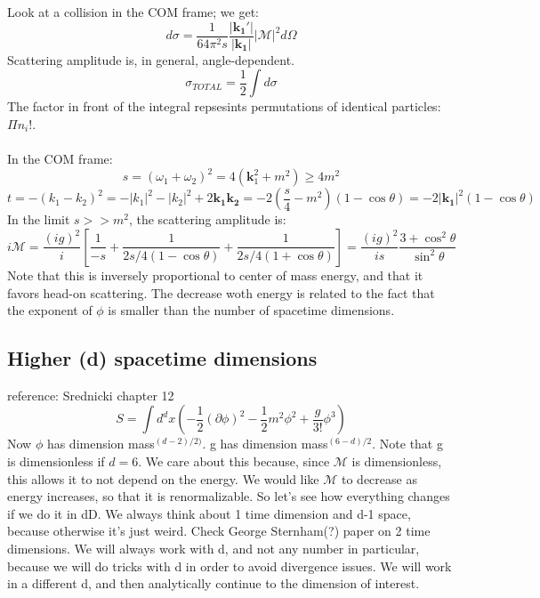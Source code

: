 \documentclass[12 pt]{article}
\begin{document}
\\
\\
Look at a collision in the COM frame; we get:
\[    d\sigma = \frac{1}{64\pi^2 s} \frac{|\mathbf{k_1'}|}{|\mathbf{k_1}|} |\mathcal{M}|^2 d\Omega  \]
Scattering amplitude is, in general, angle-dependent.
\[   \sigma_{TOTAL} = \frac{1}{2} \int d\sigma   \]
The factor in front of the integral repsesints permutations of identical particles: $\Pi n_i!$.
\\
\\
In the COM frame:
\[   s = (\omega_1+\omega_2)^2 = 4(\mathbf{k}_1^2 + m^2) \geq 4m^2  \]
\[   t = - (k_1 - k_2)^2 = - |k_1|^2 - |k_2|^2 + 2 \mathbf{k_1 k_2} = -2 (\frac{s}{4}-m^2)(1-\cos\theta) = -2|\mathbf{k_1}|^2 (1-\cos\theta)  \]
In the limit $s>>m^2$, the scattering amplitude is:
\[  i\mathcal{M} = \frac{(ig)^2}{i} \left[  \frac{1}{-s} + \frac{1}{2 s/4 (1-\cos\theta)} + \frac{1}{2 s/4 (1+\cos\theta)} \right] = \frac{(ig)^2}{is} \frac{3+\cos^2\theta}{\sin^2 \theta}  \]
Note that this is inversely proportional to center of mass energy, and that it favors head-on scattering. The decrease woth energy is related to the fact that the exponent of $\phi$ is smaller than the number of spacetime dimensions. 


\subsection*{Higher (d) spacetime dimensions}
reference: Srednicki chapter 12
\[   S = \int d^d x \left(  -\frac{1}{2}(\partial \phi)^2 - \frac{1}{2}m^2 \phi^2 + \frac{g}{3!}\phi^3   \right)   \]
Now $\phi$ has dimension mass$^{(d-2)/2)}$. g has dimension mass$^{(6-d)/2} $. Note that g is dimensionless if $d=6$. We care about this because, since $\mathcal{M}$ is dimensionless, this allows it to not depend on the energy. We would like $\mathcal{M}$ to decrease as energy increases, so that it is renormalizable. So let's see how everything changes if we do it in dD. We always think about 1 time dimension and d-1 space, because otherwise it's just weird. Check George Sternham(?) paper on 2 time dimensions. We will always work with d, and not any number in particular, because we will do tricks with d in order to avoid divergence issues. We will work in a different d, and then analytically continue to the dimension of interest.
\end{document}
